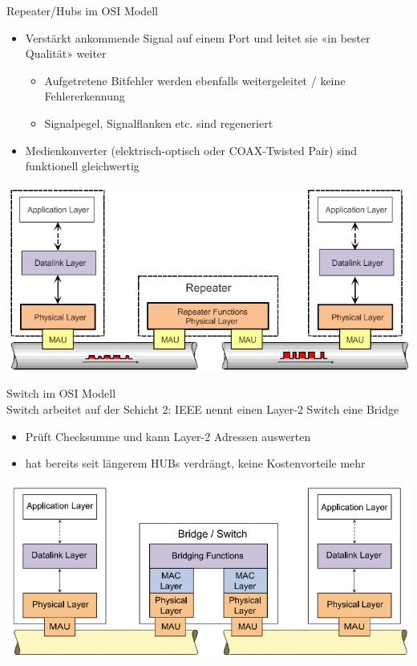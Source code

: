 \begin{definition}{Repeater/Hubs im OSI Modell}
    \begin{itemize}
        \item Verstärkt ankommende Signal auf einem Port und leitet sie «in bester Qualität» weiter
        \begin{itemize}
            \item Aufgetretene Bitfehler werden ebenfalls weitergeleitet / keine Fehlererkennung
            \item Signalpegel, Signalflanken etc. sind regeneriert
        \end{itemize}
        \item Medienkonverter (elektrisch-optisch oder COAX-Twisted Pair) sind funktionell gleichwertig
    \end{itemize}
        \includegraphics[width=1\linewidth]{images/repeater_hub_osimodell.png}
\end{definition}

\begin{definition}{Switch im OSI Modell}\\
    Switch arbeitet auf der Schicht 2: IEEE nennt einen Layer-2 Switch eine Bridge
    \begin{itemize}
        \item Prüft Checksumme und kann Layer-2 Adressen auswerten
        \item hat bereits seit längerem HUBs verdrängt, keine Kostenvorteile mehr
    \end{itemize}
    \includegraphics[width=0.8\linewidth]{images/switch_osimodell.png}
\end{definition}

